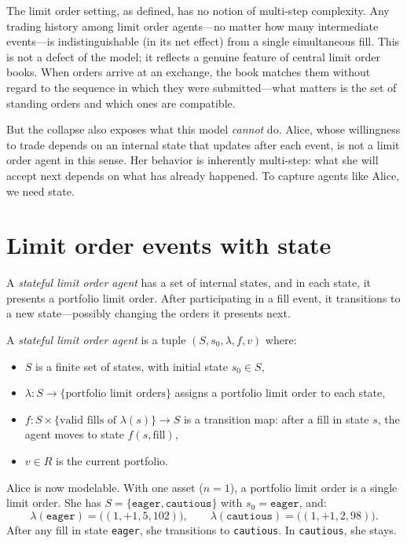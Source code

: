 \medskip
The limit order setting, as defined, has no notion of multi-step complexity.  Any trading history among limit order agents---no matter how many intermediate events---is indistinguishable (in its net effect) from a single simultaneous fill.  This is not a defect of the model; it reflects a genuine feature of central limit order books.  When orders arrive at an exchange, the book matches them without regard to the sequence in which they were submitted---what matters is the set of standing orders and which ones are compatible.

But the collapse also exposes what this model \emph{cannot} do.  Alice, whose willingness to trade depends on an internal state that updates after each event, is not a limit order agent in this sense.  Her behavior is inherently multi-step: what she will accept next depends on what has already happened.  To capture agents like Alice, we need state.

\section*{Limit order events with state}

A \emph{stateful limit order agent} has a set of internal states, and in each state, it presents a portfolio limit order.  After participating in a fill event, it transitions to a new state---possibly changing the orders it presents next.

\begin{definition}\label{def:stateful-lo}
A \emph{stateful limit order agent} is a tuple $(S, s_0, \lambda, f, v)$ where:
\begin{itemize}
\item $S$ is a finite set of states, with initial state $s_0 \in S$,
\item $\lambda\colon S \to \{\text{portfolio limit orders}\}$ assigns a portfolio limit order to each state,
\item $f\colon S \times \{\text{valid fills of } \lambda(s)\} \to S$ is a transition map: after a fill in state $s$, the agent moves to state $f(s, \text{fill})$,
\item $v \in R$ is the current portfolio.
\end{itemize}
\end{definition}

Alice is now modelable.  With one asset ($n = 1$), a portfolio limit order is a single limit order.  She has $S = \{\texttt{eager}, \texttt{cautious}\}$ with $s_0 = \texttt{eager}$, and:
\[
\lambda(\texttt{eager}) = \bigl((1,+1,5,102)\bigr), \qquad \lambda(\texttt{cautious}) = \bigl((1,+1,2,98)\bigr).
\]
After any fill in state \texttt{eager}, she transitions to \texttt{cautious}.  In \texttt{cautious}, she stays.

